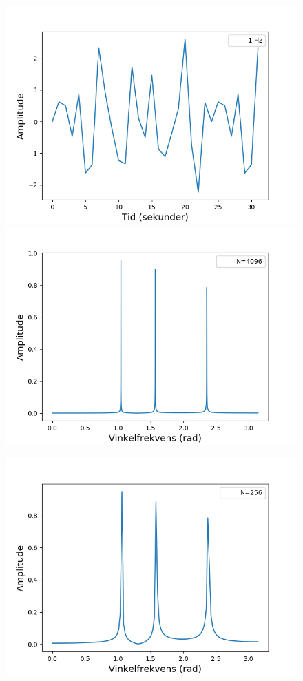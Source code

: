 \begin{figure}[H]
\begin{minipage}{0.49\textwidth}
\includegraphics[width=\textwidth]{figures/signal_1hz.png}
\includegraphics[width=\textwidth]{figures/frekvensanalyse/1hz_freq2}
\end{minipage}
\begin{minipage}{0.49\textwidth}
\includegraphics[width=\textwidth]{figures/frekvensanalyse/1hz_freq1.png}

\end{minipage}
\end{figure}
